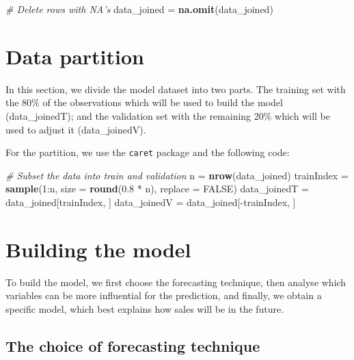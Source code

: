 \documentclass[11pt,]{article}
\newenvironment{Shaded}{\begin{snugshade}}{\end{snugshade}}
\newcommand{\KeywordTok}[1]{\textcolor[rgb]{0.13,0.29,0.53}{\textbf{{#1}}}}
\newcommand{\DataTypeTok}[1]{\textcolor[rgb]{0.13,0.29,0.53}{{#1}}}
\newcommand{\DecValTok}[1]{\textcolor[rgb]{0.00,0.00,0.81}{{#1}}}
\newcommand{\FloatTok}[1]{\textcolor[rgb]{0.00,0.00,0.81}{{#1}}}
\newcommand{\StringTok}[1]{\textcolor[rgb]{0.31,0.60,0.02}{{#1}}}
\newcommand{\CommentTok}[1]{\textcolor[rgb]{0.56,0.35,0.01}{\textit{{#1}}}}
\newcommand{\OtherTok}[1]{\textcolor[rgb]{0.56,0.35,0.01}{{#1}}}
\newcommand{\NormalTok}[1]{{#1}}
\begin{document}
\begin{Shaded}
\begin{Highlighting}[]
\CommentTok{# Delete rows with NA's}
\NormalTok{data_joined =}\StringTok{ }\KeywordTok{na.omit}\NormalTok{(data_joined)}
\end{Highlighting}
\end{Shaded}

\section{Data partition}\label{data-partition}

In this section, we divide the model dataset into two parts. The
training set with the 80\% of the observations which will be used to
build the model (data\_joinedT); and the validation set with the
remaining 20\% which will be used to adjust it (data\_joinedV).

For the partition, we use the \texttt{caret} package and the following
code:

\begin{Shaded}
\begin{Highlighting}[]
\CommentTok{# Subset the data into train and validation}
\NormalTok{n =}\StringTok{ }\KeywordTok{nrow}\NormalTok{(data_joined)}
\NormalTok{trainIndex =}\StringTok{ }\KeywordTok{sample}\NormalTok{(}\DecValTok{1}\NormalTok{:n, }\DataTypeTok{size =} \KeywordTok{round}\NormalTok{(}\FloatTok{0.8} \NormalTok{*}\StringTok{ }\NormalTok{n), }\DataTypeTok{replace =} \OtherTok{FALSE}\NormalTok{)}
\NormalTok{data_joinedT =}\StringTok{ }\NormalTok{data_joined[trainIndex, ]}
\NormalTok{data_joinedV =}\StringTok{ }\NormalTok{data_joined[-trainIndex, ]}
\end{Highlighting}
\end{Shaded}

\section{Building the model}\label{building-the-model}

To build the model, we first choose the forecasting technique, then
analyse which variables can be more influential for the prediction, and
finally, we obtain a specific model, which best explains how sales will
be in the future.

\subsection{The choice of forecasting
technique}\label{the-choice-of-forecasting-technique}
\end{document}
